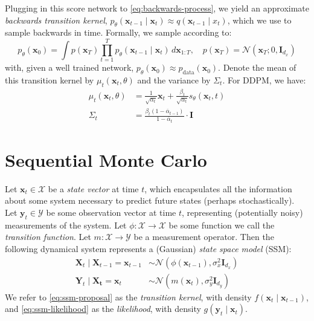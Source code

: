 Plugging in this score network to \autoref{eq:backwards-process}, we yield an approximate
\emph{backwards transition kernel},
$p_\theta(\mathbf{x}_{t-1} \mid \mathbf{x}_t) \approx q(\mathbf{x}_{t-1} \mid x_t)$, which we use to
sample backwards in time. Formally, we sample according to:
\begin{equation}
    p_\theta(\mathbf{x}_0) = \int p(\mathbf{x}_T)\prod_{t=1}^T p_\theta(\mathbf{x}_{t-1} \mid \mathbf{x}_{t})\, d\mathbf{x}_{1:T},\quad p(\mathbf{x}_T) = \mathcal{N}(\mathbf{x}_T; 0, \mathbf{I}_{d_x}) \label{eq:uncond-sampling}
\end{equation}
with, given a well trained network, $p_\theta(\mathbf{x}_0) \approx p_{\text{data}}(\mathbf{x}_0)$.
Denote the mean of this transition kernel by $\mu_t(\mathbf{x}_t, \theta)$ and the variance by
$\Sigma_t$. For DDPM, we have:
\begin{align}
    \mu_t(\mathbf{x}_t, \theta) &= \frac{1}{\sqrt{\alpha_t}}\mathbf{x}_{t} + \frac{\beta_t}{\sqrt{\alpha_t}}s_\theta(\mathbf{x}_t, t) \label{eq:ddpm-mu} \\
    \Sigma_t &= \frac{\beta_t(1 - \overline{\alpha}_{t-1})}{1 - \overline{\alpha}_t}\cdot \mathbf{I} \label{eq:ddpm-sigma}
\end{align}

\section{Sequential Monte Carlo}

\begin{definition} \label{def:ssm}
    Let $\mathbf{x}_t \in \mathcal{X}$ be a \emph{state vector} at time $t$, which encapsulates all
    the information about some system necessary to predict future states (perhaps stochastically).
    Let $\mathbf{y}_t \in \mathcal{Y}$ be some observation vector at time $t$, representing
    (potentially noisy) measurements of the system. Let $\phi: \mathcal{X} \to \mathcal{X}$ be some
    function we call the \emph{transition function}. Let $m: \mathcal{X} \to \mathcal{Y}$ be a
    measurement operator. Then the following dynamical system represents a (Gaussian)
    \emph{state space model} (SSM):
    \begin{align}
        \mathbf{X}_t \mid \mathbf{X}_{t-1} = \mathbf{x}_{t-1} &\sim \mathcal{N}(\phi(\mathbf{x}_{t-1}), \sigma_x^2 \mathbf{I}_{d_x}) \label{eq:ssm-proposal} \\
        \mathbf{Y}_t \mid \mathbf{X_t} = \mathbf{x}_t &\sim \mathcal{N}(m(\mathbf{x}_t), \sigma_y^2 \mathbf{I}_{d_y}) \label{eq:ssm-likelihood}
    \end{align}
    We refer to \autoref{eq:ssm-proposal} as the \emph{transition kernel}, with density
    $f(\mathbf{x}_t \mid \mathbf{x}_{t-1})$, and \autoref{eq:ssm-likelihood} as the \emph{likelihood},
    with density $g(\mathbf{y}_t \mid \mathbf{x}_t)$.
\end{definition}


